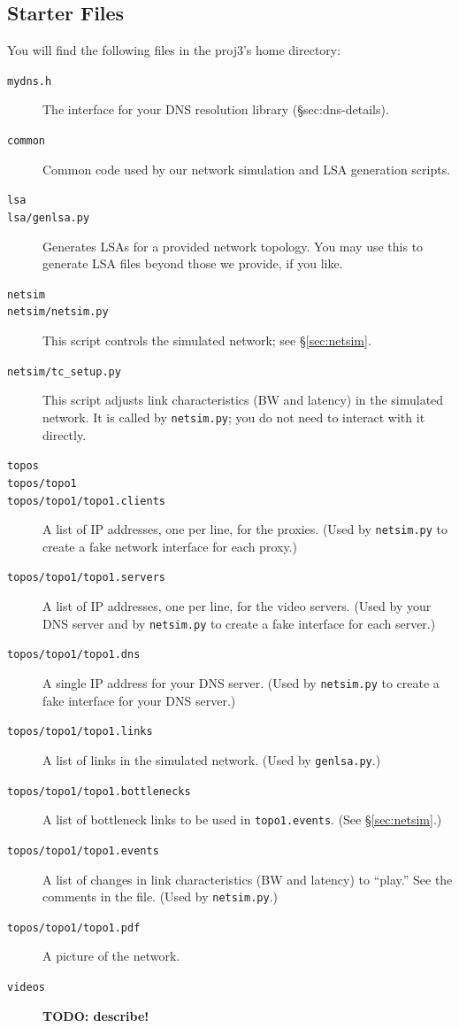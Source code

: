 \documentclass{article}
\begin{document}
\subsection{Starter Files}
\label{sec:starter-files}

You will find the following files in the proj3's home directory:
\begin{description}
	\item[\texttt{mydns.h}] The interface for your DNS resolution library (\S{sec:dns-details}).

	\item[\texttt{common}] Common code used by our network simulation and LSA generation scripts.

	\item[\texttt{lsa}]
	\item[\texttt{lsa/genlsa.py}] Generates LSAs for a provided network
	topology. You may use this to generate LSA files beyond those we provide,
	if you like.

	\item[\texttt{netsim}]
	\item[\texttt{netsim/netsim.py}] This script controls the simulated
	network; see \S\ref{sec:netsim}.
	\item[\texttt{netsim/tc\_setup.py}] This script adjusts link
	characteristics (BW and latency) in the simulated network. It is called by
	\texttt{netsim.py}; you do not need to interact with it directly.

	\item[\texttt{topos}]
	\item[\texttt{topos/topo1}]
	\item[\texttt{topos/topo1/topo1.clients}] A list of IP addresses, one per line, for the proxies. (Used by \texttt{netsim.py} to create a fake network interface for each proxy.)
	\item[\texttt{topos/topo1/topo1.servers}] A list of IP addresses, one per line, for the video servers. (Used by your DNS server and by \texttt{netsim.py} to create a fake interface for each server.)
	\item[\texttt{topos/topo1/topo1.dns}] A single IP address for your DNS server. (Used by \texttt{netsim.py} to create a fake interface for your DNS server.)
	\item[\texttt{topos/topo1/topo1.links}] A list of links in the simulated network. (Used by \texttt{genlsa.py}.)
	\item[\texttt{topos/topo1/topo1.bottlenecks}] A list of bottleneck links to be used in \texttt{topo1.events}. (See \S\ref{sec:netsim}.)
	\item[\texttt{topos/topo1/topo1.events}] A list of changes in link characteristics (BW and latency) to ``play.'' See the comments in the file. (Used by \texttt{netsim.py}.)
	\item[\texttt{topos/topo1/topo1.pdf}] A picture of the network.

	\item[\texttt{videos}] \textbf{TODO: describe!}
\end{description}
\end{document}
